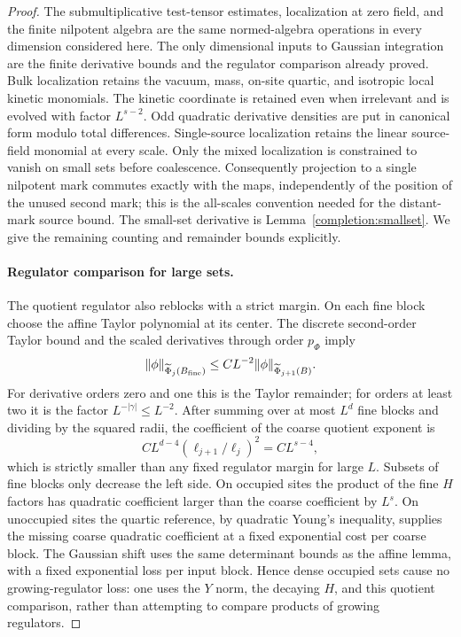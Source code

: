 \documentclass[11pt]{article}
\begin{document}
\begin{proof}
The submultiplicative test-tensor estimates, localization at zero field,
and the finite nilpotent algebra are the same normed-algebra operations
in every dimension considered here. The only dimensional inputs to Gaussian integration are the finite
derivative bounds and the regulator comparison already proved.
Bulk localization retains the vacuum, mass, on-site quartic, and
isotropic local kinetic monomials. The kinetic coordinate is retained
even when irrelevant and is evolved with factor \(L^{s-2}\). Odd
quadratic derivative densities are put in canonical form modulo total
differences. Single-source localization retains the linear source-field
monomial at every scale. Only the mixed localization is constrained to vanish
on small sets before coalescence. Consequently projection to a single
nilpotent mark commutes exactly with the maps, independently of the
position of the unused second mark; this is the all-scales convention
needed for the distant-mark source bound. The small-set derivative is
Lemma~\ref{completion:smallset}. We give the remaining counting and
remainder bounds explicitly.

\paragraph{Regulator comparison for large sets.}
The quotient regulator also reblocks with a strict margin. On each fine
block choose the affine Taylor polynomial at its center. The discrete
second-order Taylor bound and the scaled derivatives through order
\(p_\Phi\) imply
\[
 \|\phi\|_{\widetilde\Phi_j(B_{\rm fine})}
    \le C L^{-2}\|\phi\|_{\widetilde\Phi_{j+1}(B)}.
\]
For derivative orders zero and one this is the Taylor remainder;
for orders at least two it is the factor \(L^{-|\gamma|}\le L^{-2}\).
After summing over at most \(L^d\) fine blocks and dividing by the
squared radii, the coefficient of the coarse quotient exponent is
\[
 CL^{d-4}(\ell_{j+1}/\ell_j)^2=CL^{s-4},
\]
which is strictly smaller than any fixed regulator margin for large
\(L\). Subsets of fine blocks only decrease the left side.
On occupied sites the product of the fine \(H\) factors has quadratic
coefficient larger than the coarse coefficient by \(L^s\). On
unoccupied sites the quartic reference, by quadratic Young's inequality,
supplies the missing coarse quadratic coefficient at a fixed exponential
cost per coarse block. The Gaussian shift uses the same determinant
bounds as the affine lemma, with a fixed exponential loss per input
block. Hence dense occupied sets cause no growing-regulator loss: one
uses the \(Y\) norm, the decaying \(H\), and this quotient comparison,
rather than attempting to compare products of growing regulators.


\end{proof}
\end{document}
